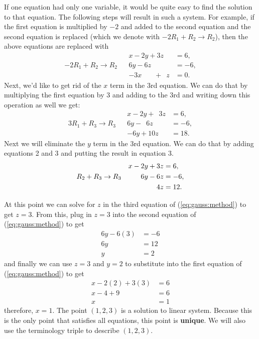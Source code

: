 If one equation had only one variable, it would be quite easy to find the solution to that equation.  The following steps will result in such a system.  For example, if the first equation is multiplied by $-2$ and added to the second equation and the second equation is replaced (which we denote with $-2R_1+R_2 \rightarrow R_2$), then the above equations are replaced with 
%
\begin{align*}
&&x -2y + 3z  &= 6, \\
-2R_1+R_2 \rightarrow R_2&&6 y-6z &= -6, \\
&&-3x \phantom{+2y}+\phantom{3} z  &= 0.
\end{align*}
Next, we'd like to get rid of the $x$ term in the 3rd equation.  We can do that by multiplying the first equation by 3 and adding to the 3rd and writing down this operation as well we get:
%
\begin{align*}
&&x -2y + \phantom{1}3z  &= 6, \\
3R_1+R_3 \rightarrow R_3 && 6 y-\phantom{1}6z &= -6, \\
&&-6y+10z & = 18. 
\end{align*}
Next we will eliminate the $y$ term in the 3rd equation.  We can do that by adding equations 2 and 3 and putting the result in equation 3. 
\begin{align}
&&x -2y + 3z  &= 6, \notag \\
R_2+R_3 \rightarrow R_3 &&  6 y-6z &= -6,  \label{eq:gauss:method} \\
&& 4z & = 12.  \notag
\end{align}

At this point we can solve for $z$ in the third equation of (\ref{eq:gauss:method}) to get $z=3$.  From this, plug in $z=3$ into the second equation of (\ref{eq:gauss:method}) to get
%
\begin{align*}
6y -6(3) & = -6  \\
6y & = 12 \\
y & = 2 
\end{align*}
and finally we can use $z=3$ and $y=2$ to substitute into the first equation of (\ref{eq:gauss:method}) to get 
%
\begin{align*}
x-2(2)+3(3)& = 6 \\
x-4+9& = 6 \\
x & = 1 
\end{align*}
therefore, $x=1$.  The point $(1,2,3)$ is a solution to linear system.    Because this is the only point that satisfies all equations, this point is \textbf{unique}.  We will also use the terminology triple to describe $(1,2,3)$.  


